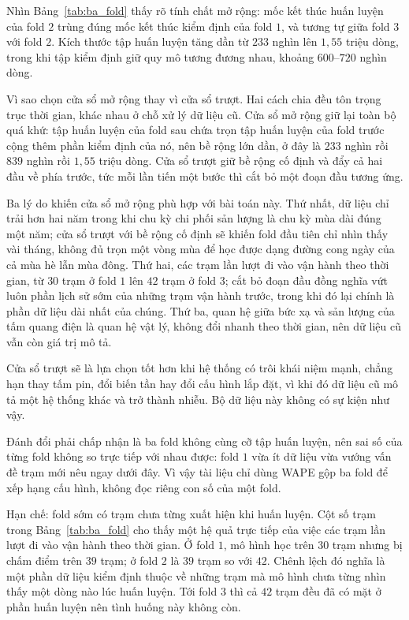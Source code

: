 \documentclass[12pt, a4paper]{report}
\begin{document}
Nhìn Bảng~\ref{tab:ba_fold} thấy rõ tính chất mở rộng: mốc kết thúc huấn luyện của fold
$2$ trùng đúng mốc kết thúc kiểm định của fold $1$, và tương tự giữa fold $3$ với fold
$2$. Kích thước tập huấn luyện tăng dần từ $233$ nghìn lên $1{,}55$ triệu dòng, trong
khi tập kiểm định giữ quy mô tương đương nhau, khoảng $600$--$720$ nghìn dòng.

Vì sao chọn cửa sổ mở rộng thay vì cửa sổ trượt. Hai cách chia đều tôn trọng
trục thời gian, khác nhau ở chỗ xử lý dữ liệu cũ. Cửa sổ mở rộng giữ lại toàn bộ quá khứ:
tập huấn luyện của fold sau chứa trọn tập huấn luyện của fold trước cộng thêm phần kiểm
định của nó, nên bề rộng lớn dần, ở đây là $233$ nghìn rồi $839$ nghìn rồi $1{,}55$ triệu
dòng. Cửa sổ trượt giữ bề rộng cố định và đẩy cả hai đầu về phía trước, tức mỗi lần tiến
một bước thì cắt bỏ một đoạn đầu tương ứng.

Ba lý do khiến cửa sổ mở rộng phù hợp với bài toán này. Thứ nhất, dữ liệu chỉ trải hơn
hai năm trong khi chu kỳ chi phối sản lượng là chu kỳ mùa dài đúng một năm; cửa sổ trượt
với bề rộng cố định sẽ khiến fold đầu tiên chỉ nhìn thấy vài tháng, không đủ trọn một
vòng mùa để học được dạng đường cong ngày của cả mùa hè lẫn mùa đông. Thứ hai, các trạm
lần lượt đi vào vận hành theo thời gian, từ $30$ trạm ở fold $1$ lên $42$ trạm ở fold $3$;
cắt bỏ đoạn đầu đồng nghĩa vứt luôn phần lịch sử sớm của những trạm vận hành trước, trong
khi đó lại chính là phần dữ liệu dài nhất của chúng. Thứ ba, quan hệ giữa bức xạ và sản
lượng của tấm quang điện là quan hệ vật lý, không đổi nhanh theo thời gian, nên dữ liệu
cũ vẫn còn giá trị mô tả.

Cửa sổ trượt sẽ là lựa chọn tốt hơn khi hệ thống có trôi khái niệm mạnh, chẳng hạn thay
tấm pin, đổi biến tần hay đổi cấu hình lắp đặt, vì khi đó dữ liệu cũ mô tả một hệ thống
khác và trở thành nhiễu. Bộ dữ liệu này không có sự kiện như vậy.

Đánh đổi phải chấp nhận là ba fold không cùng cỡ tập huấn luyện, nên sai số của từng fold
không so trực tiếp với nhau được: fold $1$ vừa ít dữ liệu vừa vướng vấn đề trạm mới nêu
ngay dưới đây. Vì vậy tài liệu chỉ dùng WAPE gộp ba fold để xếp hạng cấu hình, không đọc
riêng con số của một fold.

Hạn chế: fold sớm có trạm chưa từng xuất hiện khi huấn luyện. Cột số trạm trong
Bảng~\ref{tab:ba_fold} cho thấy một hệ quả trực tiếp của việc các trạm lần lượt đi vào vận
hành theo thời gian. Ở fold $1$, mô hình học trên $30$ trạm nhưng bị chấm điểm trên $39$
trạm; ở fold $2$ là $39$ trạm so với $42$. Chênh lệch đó nghĩa là một phần dữ liệu kiểm định
thuộc về những trạm mà mô hình chưa từng nhìn thấy một dòng nào lúc huấn luyện. Tới
fold $3$ thì cả $42$ trạm đều đã có mặt ở phần huấn luyện nên tình huống này không còn.
\end{document}
